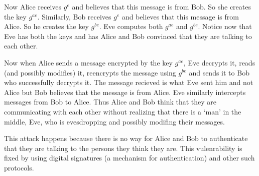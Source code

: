 \documentclass[letterpaper,12pt]{article}
\theoremstyle{remark}
\begin{document}
Now Alice receives $g^e$ and believes that this message is from Bob. So she creates the key $g^{ae}$. Similarly, Bob receives $g^e$ and believes that this message is from Alice. So he creates the key $g^{be}$. Eve computes both $g^{ae}$ and $g^{be}$. Notice now that Eve has both the keys and has Alice and Bob convinced that they are talking to each other. 

Now when Alice sends a message encrypted by the key $g^{ae}$, Eve decrypts it, reads (and possibly modifies) it, reencrypts the message using $g^{be}$ and sends it to Bob who successfully decrypts it. The message recieved is what Eve sent him and not Alice but Bob believes that the message is from Alice. Eve similarly intercepts messages from Bob to Alice. Thus Alice and Bob think that they are communicating with each other without realizing that there is a `man' in the middle, Eve, who is evesdropping and possibly modifing their messages.

This attack happens because there is no way for Alice and Bob to authenticate that they are talking to the persons they think they are. This vulenrability is fixed by using digital signatures (a mechanism for authentication) and other such protocols. 
\end{document}
